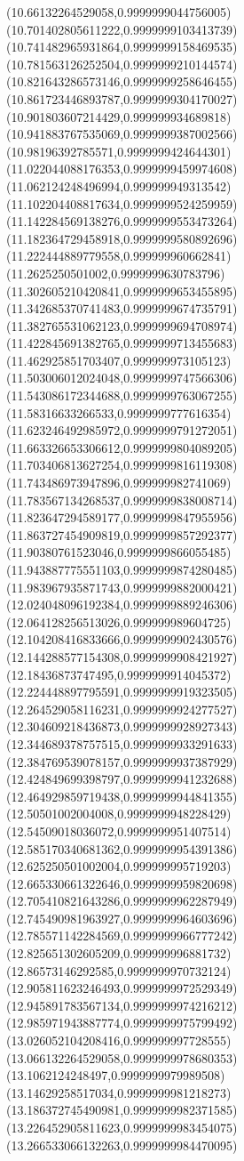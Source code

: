 {(10.66132264529058,0.9999999044756005)
(10.701402805611222,0.9999999103413739)
(10.741482965931864,0.9999999158469535)
(10.781563126252504,0.9999999210144574)
(10.821643286573146,0.9999999258646455)
(10.861723446893787,0.9999999304170027)
(10.901803607214429,0.999999934689818)
(10.941883767535069,0.9999999387002566)
(10.98196392785571,0.9999999424644301)
(11.022044088176353,0.9999999459974608)
(11.062124248496994,0.999999949313542)
(11.102204408817634,0.9999999524259959)
(11.142284569138276,0.9999999553473264)
(11.182364729458918,0.9999999580892696)
(11.222444889779558,0.999999960662841)
(11.2625250501002,0.9999999630783796)
(11.302605210420841,0.9999999653455895)
(11.342685370741483,0.9999999674735791)
(11.382765531062123,0.9999999694708974)
(11.422845691382765,0.9999999713455683)
(11.462925851703407,0.999999973105123)
(11.503006012024048,0.9999999747566306)
(11.543086172344688,0.9999999763067255)
(11.58316633266533,0.9999999777616354)
(11.623246492985972,0.9999999791272051)
(11.663326653306612,0.9999999804089205)
(11.703406813627254,0.9999999816119308)
(11.743486973947896,0.999999982741069)
(11.783567134268537,0.9999999838008714)
(11.823647294589177,0.9999999847955956)
(11.863727454909819,0.9999999857292377)
(11.90380761523046,0.9999999866055485)
(11.943887775551103,0.9999999874280485)
(11.983967935871743,0.9999999882000421)
(12.024048096192384,0.9999999889246306)
(12.064128256513026,0.999999989604725)
(12.104208416833666,0.9999999902430576)
(12.144288577154308,0.9999999908421927)
(12.18436873747495,0.9999999914045372)
(12.224448897795591,0.9999999919323505)
(12.264529058116231,0.9999999924277527)
(12.304609218436873,0.9999999928927343)
(12.344689378757515,0.9999999933291633)
(12.384769539078157,0.9999999937387929)
(12.424849699398797,0.9999999941232688)
(12.464929859719438,0.9999999944841355)
(12.50501002004008,0.9999999948228429)
(12.54509018036072,0.9999999951407514)
(12.585170340681362,0.9999999954391386)
(12.625250501002004,0.999999995719203)
(12.665330661322646,0.9999999959820698)
(12.705410821643286,0.9999999962287949)
(12.745490981963927,0.9999999964603696)
(12.785571142284569,0.9999999966777242)
(12.825651302605209,0.999999996881732)
(12.86573146292585,0.9999999970732124)
(12.905811623246493,0.9999999972529349)
(12.945891783567134,0.9999999974216212)
(12.985971943887774,0.9999999975799492)
(13.026052104208416,0.999999997728555)
(13.066132264529058,0.9999999978680353)
(13.1062124248497,0.9999999979989508)
(13.14629258517034,0.9999999981218273)
(13.186372745490981,0.9999999982371585)
(13.226452905811623,0.9999999983454075)
(13.266533066132263,0.9999999984470095)
}
